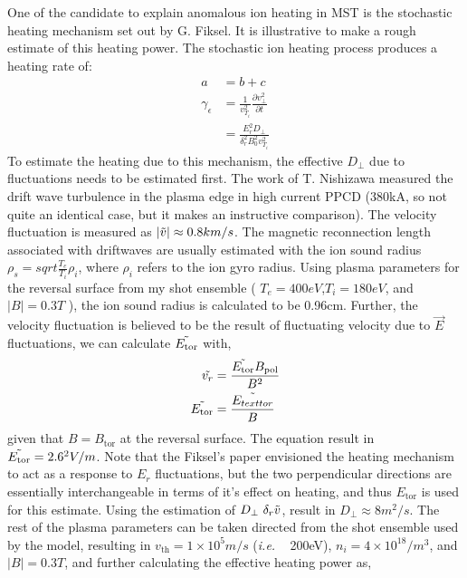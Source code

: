 
One of the candidate to explain anomalous  ion heating in MST is the stochastic heating mechanism set out by G. Fiksel\cite{Fiksel2009}. It is illustrative to make a rough estimate of this heating power. The stochastic ion heating process produces a heating rate of:
\begin{align}
    a &= b+c\\
    \gamma_{\epsilon} &= \frac{1}{v^2_{T_i}}\frac{\partial v^2_{\perp}}{\partial t}\\
    & = \frac{E^2_r D_{\perp}}{\delta^2_r B^2_0 v^2_{T_i}}
\end{align}
To estimate the heating due to this mechanism, the effective $D_\perp$ due to fluctuations needs to be estimated first.
The work of T. Nishizawa\cite{Nishizawa2018} measured the drift wave turbulence in the plasma edge in high current PPCD (380kA, so not quite an identical case, but it makes an instructive comparison). The velocity fluctuation is measured as $|\Tilde{v}| \approx 0.8 km/s$. The magnetic reconnection length associated with driftwaves are usually estimated with the ion sound radius $\rho_s = sqrt{\frac{T_e}{T_i}}\rho_i$, where $\rho_i$ refers to the ion gyro radius. Using plasma parameters for the reversal surface from my shot ensemble ( $T_e = 400 eV$,$T_i = 180 eV$, and $|B| = 0.3 T$ ), the ion sound radius is calculated to be 0.96cm. Further, the velocity fluctuation is believed to be the result of fluctuating \ecb velocity due to $\Vec{E}$ fluctuations, we can calculate $\Tilde{E_{\text{tor}}}$ with,
\begin{align}
    \Tilde{v_r} &= \frac{\Tilde{E_{\text{tor}}}B_{\text{pol}}}{B^2}\\
    \Tilde{E_{\text{tor}}} &= \frac{\Tilde{E_{text{tor}}}}{B}
\end{align}
given that $B = B_{\text{tor}}$ at the reversal surface. The equation result in $\Tilde{E_{\text{tor}}} = 2.6\time 10^2 V/m$. Note that the Fiksel's paper envisioned the heating mechanism to act as a response to $E_r$ fluctuations, but the two perpendicular directions are essentially interchangeable in terms of it's effect on heating, and thus $E_{\text{tor}}$ is used for this estimate. Using the estimation of $D_\perp ~ \delta_r \Tilde{v}$, result in $D_\perp \approx 8m^2/s$. The rest of the plasma parameters can be taken directed from the shot ensemble used by the model, resulting in $v_{\text{th}} = 1\times10^5 m/s$ (\textit{i.e.}  ~ 200eV), $n_i = 4\times10^18 /m^3$, and $|B| = 0.3 T$, and further calculating the effective heating power as,
